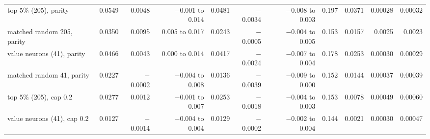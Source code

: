 \documentclass[11pt]{article}
\begin{document}
\begin{table}[t]
{\begin{tabular}{lrrrrrrrrrr}
\midrule
top 5\% (205), parity & 0.0549 & 0.0048 & $-$0.001 to 0.014 & 0.0481 & $-$0.0034 & $-$0.008 to 0.003 & 0.197 & 0.0371 & 0.00028 & 0.00032 \\
matched random 205, parity & 0.0350 & 0.0095 & 0.005 to 0.017 & 0.0243 & $-$0.0005 & $-$0.004 to 0.005 & 0.153 & 0.0157 & 0.0025 & 0.0023 \\
value neurons (41), parity & 0.0466 & 0.0043 & 0.000 to 0.014 & 0.0417 & $-$0.0024 & $-$0.007 to 0.004 & 0.178 & 0.0253 & 0.00030 & 0.00029 \\
matched random 41, parity & 0.0227 & $-$0.0002 & $-$0.004 to 0.008 & 0.0136 & $-$0.0039 & $-$0.009 to 0.000 & 0.152 & 0.0144 & 0.00037 & 0.00039 \\
\midrule
top 5\% (205), cap 0.2 & 0.0277 & 0.0012 & $-$0.001 to 0.007 & 0.0253 & $-$0.0018 & $-$0.004 to 0.003 & 0.153 & 0.0078 & 0.00049 & 0.00060 \\
value neurons (41), cap 0.2 & 0.0127 & $-$0.0014 & $-$0.004 to 0.004 & 0.0129 & $-$0.0002 & $-$0.002 to 0.004 & 0.144 & 0.0021 & 0.00030 & 0.00047 \\
\bottomrule
\end{tabular}}
\end{table}
\end{document}
